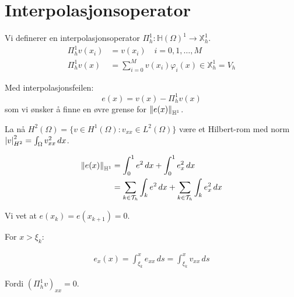 \documentclass[../main.tex]{subfiles}
\begin{document}
\section{Interpolasjonsoperator}
\label{sec:interpolasjonsoperator}
Vi definerer en interpolasjonsoperator $\Pi_h^1: \mathbb{H}(\Omega)^1 \to \mathbb{X}_h^1$.
\begin{align*}
    \Pi_h^1 v(x_i) & = v(x_i) \quad i = 0, 1, \ldots, M                          \\
    \Pi_h^1 v(x)   & = \sum_{i=0}^M v(x_i) \varphi_i(x) \in \mathbb{X}_h^1 = V_h
\end{align*}

Med interpolasjonsfeilen:
\[
    e(x) = v(x) - \Pi_h^1 v(x)
\]
som vi ønsker å finne en øvre grense for \(\norm*{e(x)}_{\mathbb{H}^1} \).

La nå $H^2(\Omega) = \{v \in H^1(\Omega) : v_{xx} \in L^2(\Omega)\}$ være et Hilbert-rom med norm $\abs*{v}_{H^2}^2 = \int_\Omega v_{xx}^2 \, dx$.

\begin{align*}
    \norm*{e(x)}_{\mathbb{H}^1} & = \int_0^1 e^2 \, dx + \int_0^1 e_x^2 \, dx                                                   \\
                                & = \sum_{k\in\mathcal{T}_h} \int_{k} e^2 \, dx + \sum_{k\in\mathcal{T}_h} \int_{k} e_x^2 \, dx
\end{align*}

Vi vet at $e(x_k) = e(x_{k+1}) = 0$.

For $x > \xi_k$:

\begin{align*}
    e_x(x) = \int_{\xi_k}^x e_{xx} \, ds = \int_{\xi_k}^x v_{xx} \, ds
\end{align*}

Fordi $(\Pi_h^1 v)_{xx} = 0$.
\end{document}
